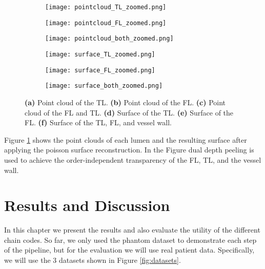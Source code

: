 \documentclass[thesis.tex]{subfiles}
\begin{document}
\begin{figure}[h]
\centering
\begin{subfigure}{0.30\textwidth}
		\texttt{[image: pointcloud\_TL\_zoomed.png]}
	\caption{}		
	\end{subfigure}
\begin{subfigure}{0.30\textwidth}
		\texttt{[image: pointcloud\_FL\_zoomed.png]}
	\caption{}		
	\end{subfigure}
\begin{subfigure}{0.30\textwidth}
		\texttt{[image: pointcloud\_both\_zoomed.png]}
	\caption{}		
	\end{subfigure}

\begin{subfigure}{0.30\textwidth}
		\texttt{[image: surface\_TL\_zoomed.png]}
	\caption{}		
	\end{subfigure}
\begin{subfigure}{0.30\textwidth}
		\texttt{[image: surface\_FL\_zoomed.png]}
	\caption{}		
	\end{subfigure}
\begin{subfigure}{0.30\textwidth}
		\texttt{[image: surface\_both\_zoomed.png]}
	\caption{}		
	\end{subfigure}
\caption{\textbf{(a)} Point cloud of the TL. \textbf{(b)} Point cloud of the FL. \textbf{(c)} Point cloud of the FL and TL. \textbf{(d)} Surface of the TL. \textbf{(e)} Surface of the FL. \textbf{(f)} Surface of the TL, FL, and vessel wall.}
\label{pointclouds}
\end{figure}

Figure \ref{pointclouds} shows the point clouds of each lumen and the resulting surface after applying the poisson surface reconstruction. In the Figure dual depth peeling \cite{bavoil2008order} is used to achieve the order-independent transparency of the FL, TL, and the vessel wall. 

\chapter{Results and Discussion}\label{chap:basics}
In this chapter we present the results and also evaluate the utility of the different chain codes. So far, we only used the phantom dataset to demonstrate each step of the pipeline, but for the evaluation we will use real patient data. Specifically, we will use the 3 datasets shown in Figure \ref{fig:datasets}.
\end{document}
